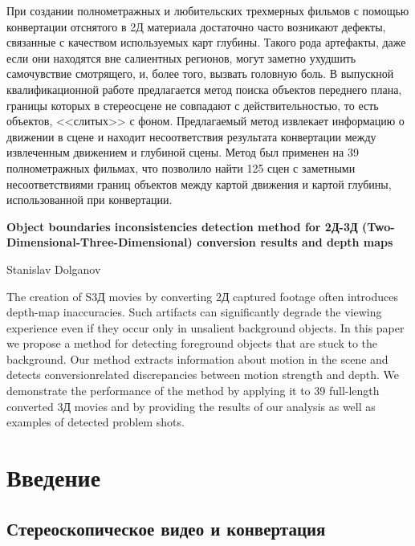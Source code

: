 \documentclass[14pt, a4paper]{extarticle}
\begin{document}
При создании полнометражных и любительских трехмерных фильмов с помощью 
конвертации отснятого в 2Д материала достаточно часто возникают дефекты, 
связанные с качеством используемых карт глубины. Такого рода артефакты, 
даже если они находятся вне салиентных регионов,  могут заметно ухудшить 
самочувствие смотрящего, и, более того, вызвать головную боль. В выпускной
квалификационной работе предлагается метод поиска объектов переднего плана, границы которых 
в стереосцене не совпадают с действительностью, то есть объектов, <<слитых>> 
с фоном. Предлагаемый метод извлекает информацию о движении в сцене и 
находит несоответствия результата конвертации между извлеченным движением и глубиной сцены.
Метод был применен на 39 полнометражных фильмах, что позволило найти 125 сцен 
с заметными несоответствиями границ объектов между картой движения и картой глубины, 
использованной при конвертации.

\vspace{2cm}

\textbf{Object boundaries inconsistencies detection method 
for 2Д-3Д (Two-Dimensional-Three-Dimensional)
conversion results and depth maps}

\vspace{0.5cm}
Stanislav Dolganov
\vspace{0.5cm}

The creation of S3Д movies by converting 2Д captured footage
often introduces depth-map inaccuracies. Such artifacts can
significantly degrade the viewing experience even if they occur
only in unsalient background objects.
In this paper we propose a method for detecting foreground
objects that are stuck to the background. Our method extracts
information about motion in the scene and detects conversionrelated
discrepancies between motion strength and depth. We
demonstrate the performance of the method by applying it
to 39 full-length converted 3Д movies and by providing the
results of our analysis as well as examples of detected problem
shots.

\newpage
{}
\tableofcontents

\newpage
\section{Введение}

\subsection{Стереоскопическое видео и конвертация}
\end{document}
